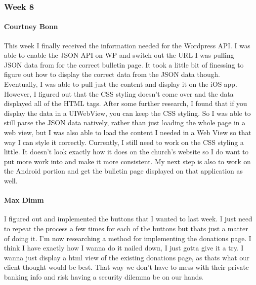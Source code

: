 		\subsubsection{Week 8}

			\paragraph{Courtney Bonn}
			This week I finally received the information needed for the Wordpress API. I was able to enable the JSON API on WP and switch out the URL I was pulling JSON data from for the correct bulletin page. It took a little bit of finessing to figure out how to display the correct data from the JSON data though. Eventually, I was able to pull just the content and display it on the iOS app. However, I figured out that the CSS styling doesn't come over and the data displayed all of the HTML tags. After some further research, I found that if you display the data in a UIWebView, you can keep the CSS styling. So I was able to still parse the JSON data natively, rather than just loading the whole page in a web view, but I was also able to load the content I needed in a Web View so that way I can style it correctly. Currently, I still need to work on the CSS styling a little. It doesn't look exactly how it does on the church's website so I do want to put more work into and make it more consistent. My next step is also to work on the Android portion and get the bulletin page displayed on that application as well.

			\paragraph{Max Dimm}
			I figured out and implemented the buttons that I wanted to last week. I just need to repeat the process a few times for each of the buttons but thats just a matter of doing it. I'm now researching a method for implementing the donations page. I think I have exactly how I wanna do it nailed down, I just gotta give it a try. I wanna just display a html view of the existing donations page, as thats what our client thought would be best. That way we don't have to mess with their private banking info and risk having a security dilemma be on our hands.

